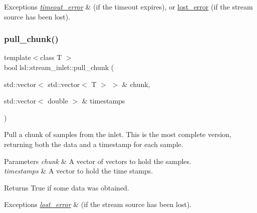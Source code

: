 \begin{DoxyExceptions}{Exceptions}
{\em \hyperlink{classlsl_1_1timeout__error}{timeout\+\_\+error}} & (if the timeout expires), or \hyperlink{classlsl_1_1lost__error}{lost\+\_\+error} (if the stream source has been lost). \\
\hline
\end{DoxyExceptions}
\mbox{\label{classlsl_1_1stream__inlet_af9051121db6ffa6945bd2288b2bf2a15}} 
\subsubsection{\texorpdfstring{pull\+\_\+chunk()}{pull\_chunk()}\hspace{0.1cm}{\footnotesize\ttfamily [1/3]}}
{\footnotesize\ttfamily template$<$class T $>$ \\
bool lsl\+::stream\+\_\+inlet\+::pull\+\_\+chunk (\begin{DoxyParamCaption}\item[{std\+::vector$<$ std\+::vector$<$ T $>$ $>$ \&}]{chunk,  }\item[{std\+::vector$<$ double $>$ \&}]{timestamps }\end{DoxyParamCaption})\hspace{0.3cm}{\ttfamily [inline]}}

Pull a chunk of samples from the inlet. This is the most complete version, returning both the data and a timestamp for each sample. 
\begin{DoxyParams}{Parameters}
{\em chunk} & A vector of vectors to hold the samples. \\
\hline
{\em timestamps} & A vector to hold the time stamps. \\
\hline
\end{DoxyParams}
\begin{DoxyReturn}{Returns}
True if some data was obtained. 
\end{DoxyReturn}

\begin{DoxyExceptions}{Exceptions}
{\em \hyperlink{classlsl_1_1lost__error}{lost\+\_\+error}} & (if the stream source has been lost). \\
\hline
\end{DoxyExceptions}
\mbox{\label{classlsl_1_1stream__inlet_acf6cdc3afdbb4c31c97fb979e4aca632}} 
